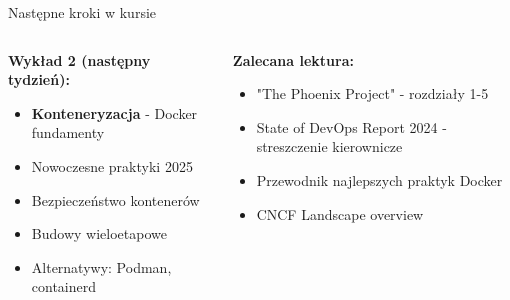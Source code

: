 \documentclass[10pt, aspectratio=169]{beamer}
\begin{document}
\begin{frame}{Następne kroki w kursie}
\begin{columns}[T]
\begin{column}{0.5\textwidth}
\textbf{Wykład 2 (następny tydzień):}
\begin{itemize}
\item \textbf{Konteneryzacja} - Docker fundamenty
\item Nowoczesne praktyki 2025
\item Bezpieczeństwo kontenerów
\item Budowy wieloetapowe
\item Alternatywy: Podman, containerd
\end{itemize}
\end{column}
\begin{column}{0.5\textwidth}
\textbf{Zalecana lektura:}
\begin{itemize}
\item "The Phoenix Project" - rozdziały 1-5
\item State of DevOps Report 2024 - streszczenie kierownicze
\item Przewodnik najlepszych praktyk Docker
\item CNCF Landscape overview
\end{itemize}
\end{column}
\end{columns}
\end{frame}
\end{document}
